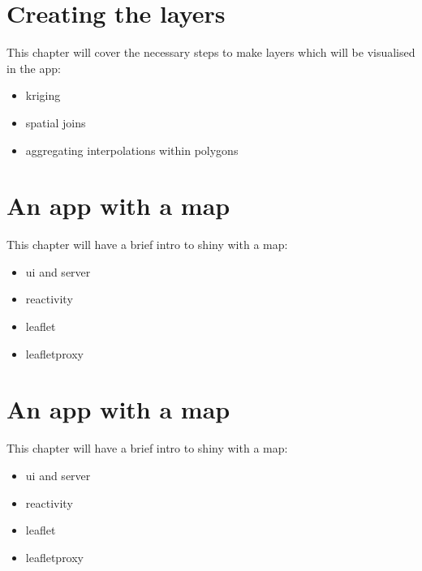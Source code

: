 \documentclass[
]{book}
\providecommand{\tightlist}{%
  \setlength{\itemsep}{0pt}\setlength{\parskip}{0pt}}
\begin{document}
\hypertarget{building}{%
\chapter{Creating the layers}\label{building}}

This chapter will cover the necessary steps to make layers which will be visualised in the app:

\begin{itemize}
\tightlist
\item
  kriging
\item
  spatial joins
\item
  aggregating interpolations within polygons
\end{itemize}

\hypertarget{shiny-intro}{%
\chapter{An app with a map}\label{shiny-intro}}

This chapter will have a brief intro to shiny with a map:

\begin{itemize}
\tightlist
\item
  ui and server
\item
  reactivity
\item
  leaflet
\item
  leafletproxy
\end{itemize}

\hypertarget{shiny-methods}{%
\chapter{An app with a map}\label{shiny-methods}}

This chapter will have a brief intro to shiny with a map:

\begin{itemize}
\tightlist
\item
  ui and server
\item
  reactivity
\item
  leaflet
\item
  leafletproxy
\end{itemize}

  
\end{document}
